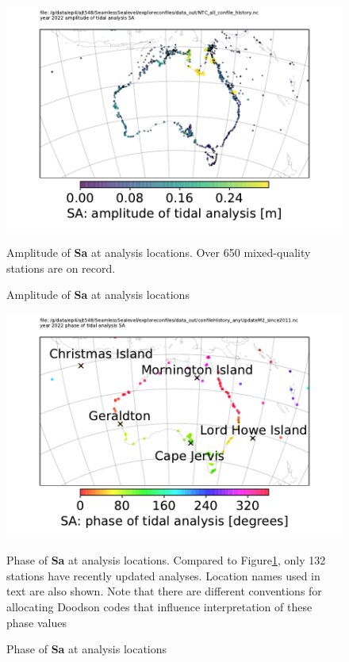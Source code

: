 \begin{figure}[h]{\figwidthFull}
    \includegraphics[trim={0 0 0 1cm},clip,width=\textwidth]{figures/maps/locations_SaAmp.pdf} 
    \caption{Amplitude of \textbf{Sa} at analysis locations}
    {Amplitude of \textbf{Sa} at analysis locations. Over 650 mixed-quality stations are on record.}
    \label{fig:SaAmp}
\end{figure}
\begin{figure}[h]{\figwidthFull}
    \includegraphics[trim={0 0 0 1cm},clip,width=\textwidth]{figures/maps/locations_SaPhaAnyM2Update.pdf} 
    \caption{Phase of \textbf{Sa} at analysis locations}
    {Phase of \textbf{Sa} at analysis locations. Compared to Figure\ref{fig:SaAmp}, only 132 stations have recently updated analyses. Location names used in text are also shown. Note that there are different conventions for allocating Doodson codes that influence interpretation of these phase values \citep[10.4]{PCTMSL-sp9}}
    \label{fig:SaPha}
\end{figure}   

